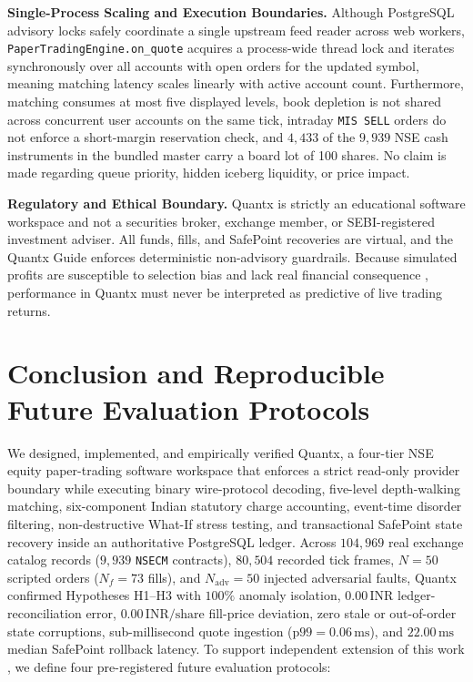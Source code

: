 \documentclass[12pt]{article}
\newcommand{\thinunit}[2]{#1\,\text{#2}}
\begin{document}
\textbf{Single-Process Scaling and Execution Boundaries.} Although PostgreSQL advisory locks safely coordinate a single upstream feed reader across web workers, \texttt{PaperTradingEngine.on\_quote} acquires a process-wide thread lock and iterates synchronously over all accounts with open orders for the updated symbol, meaning matching latency scales linearly with active account count. Furthermore, matching consumes at most five displayed levels, book depletion is not shared across concurrent user accounts on the same tick, intraday \texttt{MIS SELL} orders do not enforce a short-margin reservation check, and $4{,}433$ of the $9{,}939$ NSE cash instruments in the bundled master carry a board lot of 100 shares. No claim is made regarding queue priority, hidden iceberg liquidity, or price impact.

\textbf{Regulatory and Ethical Boundary.} Quantx is strictly an educational software workspace and not a securities broker, exchange member, or SEBI-registered investment adviser. All funds, fills, and SafePoint recoveries are virtual, and the Quantx Guide enforces deterministic non-advisory guardrails. Because simulated profits are susceptible to selection bias and lack real financial consequence \cite{bailey2014}, performance in Quantx must never be interpreted as predictive of live trading returns.

\section{Conclusion and Reproducible Future Evaluation Protocols}

We designed, implemented, and empirically verified Quantx, a four-tier NSE equity paper-trading software workspace that enforces a strict read-only provider boundary while executing binary wire-protocol decoding, five-level depth-walking matching, six-component Indian statutory charge accounting, event-time disorder filtering, non-destructive What-If stress testing, and transactional SafePoint state recovery inside an authoritative PostgreSQL ledger. Across $104{,}969$ real exchange catalog records ($9{,}939$ \texttt{NSECM} contracts), $80{,}504$ recorded tick frames, $N=50$ scripted orders ($N_f=73$ fills), and $N_{\mathrm{adv}}=50$ injected adversarial faults, Quantx confirmed Hypotheses H1--H3 with $100\%$ anomaly isolation, $\thinunit{0.00}{INR}$ ledger-reconciliation error, $\thinunit{0.00}{INR/share}$ fill-price deviation, zero stale or out-of-order state corruptions, sub-millisecond quote ingestion ($\text{p99}=\thinunit{0.06}{ms}$), and $\thinunit{22.00}{ms}$ median SafePoint rollback latency. To support independent extension of this work \cite{peng2011}, we define four pre-registered future evaluation protocols:
\end{document}
